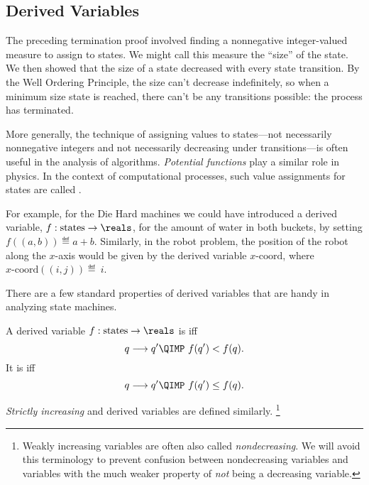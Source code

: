 \subsection{Derived Variables}\label{derived_var_subsec}

The preceding termination proof involved finding a nonnegative
integer-valued measure to assign to states.  We might call this measure
the ``size'' of the state.  We then showed that the size of a state
decreased with every state transition.  By the Well Ordering Principle,
the size can't decrease indefinitely, so when a minimum size state is
reached, there can't be any transitions possible: the process has
terminated.

More generally, the technique of assigning values to states---not
necessarily nonnegative integers and not necessarily decreasing under
transitions---is often useful in the analysis of algorithms.
\emph{Potential functions} play a similar role in physics.  In the
context of computational processes, such value assignments for states
are called .

For example, for the Die Hard machines we could have introduced a derived
variable, $f:\text{states} \to \reals$, for the amount of water in both
buckets, by setting $f((a, b)) \eqdef a + b$.  Similarly, in the robot
problem, the position of the robot along the $x$-axis would be given by
the derived variable $x\text{-coord}$, where $x\text{-coord}((i, j))
\eqdef~i$.


There are a few standard properties of derived variables that are handy in
analyzing state machines.

\begin{definition}
  A derived variable $f:\text{states} \to \reals$ is  iff
\[
q \movesto q' \QIMP\ f(q') < f(q).
\]
It is  iff
\[
q \movesto q' \QIMP\ f(q') \leq f(q).
\]

\emph{Strictly increasing}%
and  derived variables are defined similarly.
\footnote{Weakly increasing variables
  are often also called \emph{nondecreasing}.  We will avoid this
  terminology to prevent confusion between nondecreasing variables and
  variables with the much weaker property of \emph{not} being a
  decreasing variable.}
\end{definition}

